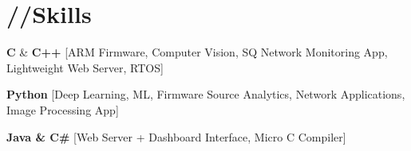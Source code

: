 \documentclass[10pt, letterpaper]{article}
\newcommand{\emphasis}[1]{
    \textcolor{purduegold}{\textbf{#1}}
}
\begin{document}
\section*{\huge{//Skills}}
    \begin{enumerate}[label={[\arabic*]}]
        \setcounter{enumi}{-1}
        \item \emphasis{C} \& \emphasis{C++}\hspace{10pt}[ARM Firmware, Computer Vision, SQ Network Monitoring App, Lightweight Web Server, RTOS]\\
            \hspace*{1in}{Frameworks $\rightarrowtriangle$ [OpenCV, QT, CUDA, libArgus]}
        \item \emphasis{Python}\hspace{26pt}[Deep Learning, ML, Firmware Source Analytics, Network Applications, Image Processing App]\\
            \hspace*{1in}{Frameworks $\rightarrowtriangle$ [Scikit, Numpy, PyTorch, Keras, OpenCV, PyQT]}
        \item \emphasis{Java \& C\#}\hspace{10pt}[Web Server + Dashboard Interface, Micro C Compiler]\\
            \hspace*{1in}{Frameworks $\rightarrowtriangle$ [Apache, Bootstrap CSS, Ajax, WMI, .NET]}
        
    \end{enumerate}
    \vspace{-10mm}
\end{document}
